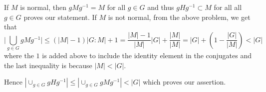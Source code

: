 \documentclass[12pt]{exam}
\theoremstyle{plain} %
\theoremstyle{definition} %
\theoremstyle{remark} %
\begin{document}
\begin{questions}
\begin{solution}
    If $M$ is normal, then $gMg^{-1} = M$ for all $g \in G$ and thus $gHg^{-1}
    \subset M$ for all all $g \in G$ proves our statement.
    If $M$ is not normal, from the above problem, we get that \[
      \big|\bigcup_{g \in G}gMg^{-1}\big| \le (|M| - 1)|G:M| + 1 =
      \frac{|M|-1}{|M|}|G| + \frac{|M|}{|M|} = |G| + (1 - \frac{|G|}{|M|}) < |G|
    \]
    where the $1$ is added above to include the identity element in
    the conjugates and the last inequality is because $|M| < |G|$.

    Hence $|\cup_{g \in G}gHg^{-1}| \le |\cup_{g \in G}gMg^{-1}| <
    |G|$ which proves our assertion.

  \end{solution}

\end{questions}
\printbibliography[heading=bibintoc]
\end{document}
